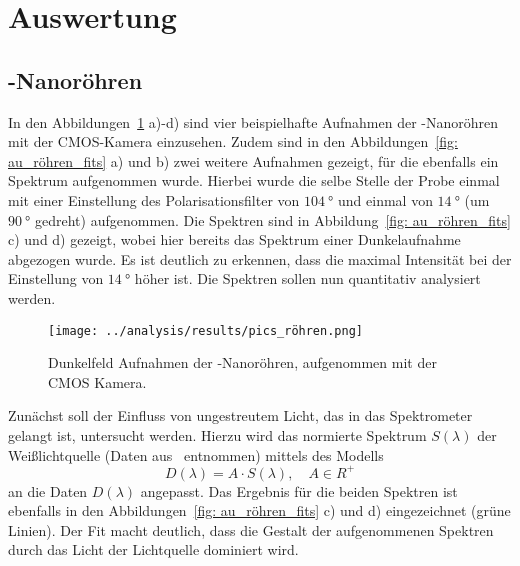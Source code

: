 \section{Auswertung}

\subsection{-Nanoröhren}
\label{sec: auröhren}
In den Abbildungen~\ref{fig: au_röhren_bilder} a)-d) sind vier beispielhafte Aufnahmen der
-Nanoröhren mit der CMOS-Kamera einzusehen.
Zudem sind in den Abbildungen~\ref{fig: au_röhren_fits} a) und b) zwei weitere Aufnahmen gezeigt, für die
ebenfalls ein Spektrum aufgenommen wurde. Hierbei wurde die selbe Stelle der
Probe einmal mit einer Einstellung des Polarisationsfilter von $\SI{104}{\degree}$
und einmal von $\SI{14}{\degree}$ (um $\SI{90}{\degree}$ gedreht) aufgenommen.
Die Spektren sind in Abbildung~\ref{fig: au_röhren_fits} c) und d) gezeigt, wobei
hier bereits das Spektrum einer Dunkelaufnahme abgezogen wurde. Es ist deutlich zu erkennen, dass
die maximal Intensität bei der Einstellung von $\SI{14}{\degree}$ höher ist. Die Spektren sollen
nun quantitativ analysiert werden.
\begin{figure}
  \centering
  \texttt{[image: ../analysis/results/pics\_röhren.png]}
  \caption{Dunkelfeld Aufnahmen der -Nanoröhren, aufgenommen mit der CMOS Kamera.}
  \label{fig: au_röhren_bilder}
\end{figure}

Zunächst soll der Einfluss von ungestreutem Licht, das in das Spektrometer gelangt ist, untersucht werden.
Hierzu wird das normierte Spektrum $S(\lambda)$ der Weißlichtquelle (Daten aus~\cite{thorlabs} entnommen)
mittels des Modells
\begin{equation}
  D(\lambda) = A \cdot S(\lambda), \quad A \in R^{+}
  \label{eq: fit_light}
\end{equation}
an die Daten $D(\lambda)$ angepasst. Das Ergebnis für die beiden Spektren ist ebenfalls in den Abbildungen~\ref{fig: au_röhren_fits} c) und d)
eingezeichnet (grüne Linien). Der Fit macht deutlich, dass die Gestalt der aufgenommenen Spektren
durch das Licht der Lichtquelle dominiert wird.


